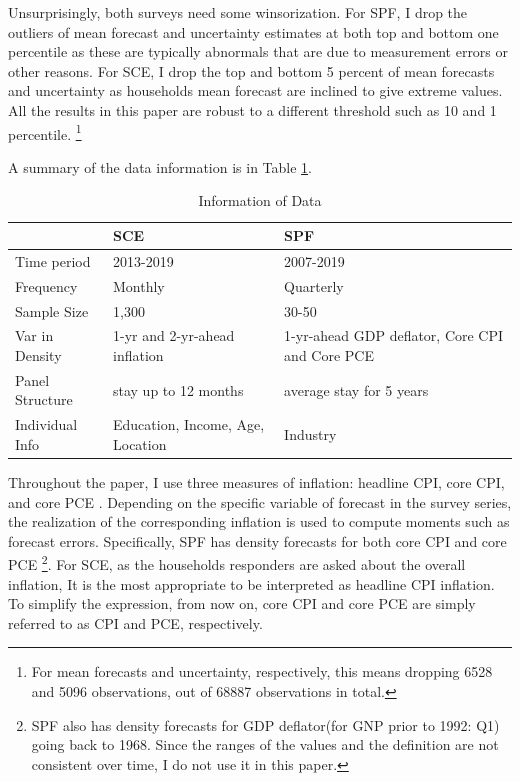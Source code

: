 \documentclass[12pt]{article}
\begin{document}
	
	Unsurprisingly, both surveys need some winsorization. For SPF, I drop the outliers of mean forecast and uncertainty estimates at both top and bottom one percentile as these are typically abnormals that are due to measurement errors or other reasons.   For SCE, I drop the top and bottom 5 percent of mean forecasts and uncertainty as households mean forecast are inclined to give extreme values. All the results in this paper are robust to a different threshold such as 10 and 1 percentile. \footnote{For mean forecasts and uncertainty, respectively, this means dropping 6528 and 5096 observations, out of 68887 observations in total.}
	
	A summary of the data information is in Table \ref{DataInfo}. 

	\begin{table}[p]
		\caption{Information of Data}
		\label{DataInfo}
		\begin{tabularx}{\textwidth}{|X|X|X|}
			\hline 
			& SCE & SPF        \\
			\hline 
			Time period                                    & 2013-2019                           &
			 2007-2019             \\
			 \hline 
			Frequency                                      & Monthly                                 & Quarterly                \\
			\hline 
			Sample Size                                    & 1,300                                   & 30-50                    \\
			\hline 
			Var in Density                       & 1-yr and 2-yr-ahead inflation          & 1-yr-ahead GDP deflator, Core CPI and Core PCE         \\
			\hline 
			Panel Structure                               & stay up to 12 months                    & average stay for 5 years \\
			\hline 
			Individual Info                        & Education, Income, Age, Location        & Industry    \\
			\hline 
		\end{tabularx}
	\end{table}
	
	Throughout the paper, I use three measures of inflation: headline CPI, core CPI, and core PCE . Depending on the specific variable of forecast in the survey series, the realization of the corresponding inflation is used to compute moments such as forecast errors. Specifically, SPF has density forecasts for both core CPI and core PCE \footnote{SPF also has density forecasts for GDP deflator(for GNP prior to 1992: Q1) going back to 1968. Since the ranges of the values and the definition are not consistent over time, I do not use it in this paper.}. For SCE, as the households responders are asked about the overall inflation, It is the most appropriate to be interpreted as headline CPI inflation. To simplify the expression, from now on, core CPI and core PCE are simply referred to as CPI and PCE, respectively. 
\end{document}
